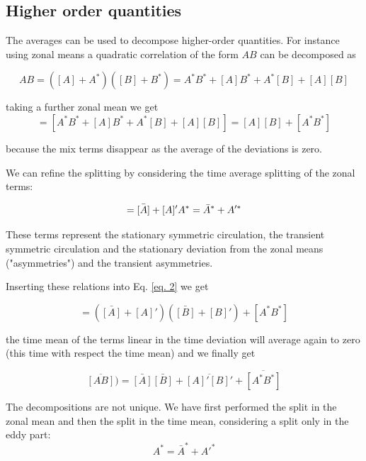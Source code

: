 \subsection{Higher order quantities}

The averages can be used to decompose higher-order quantities. For
instance using zonal means a quadratic correlation of the form \(A B\)
can be decomposed as

\begin{equation}
    A B = ([A]+A^*)([B]+B^*) = A^*B^* + [A] B^*+ A^*[B] + [A][B]
\end{equation}

taking a further zonal mean we get
\begin{equation}\label{eq. 2}
= [A^*B^*+ [A]B^* + A^*[B] + [A][B]] =  [A][B] + [A^*B^*]
\end{equation}

because the mix terms disappear as the average of the deviations is
zero.

We can refine the splitting by considering the time average splitting of
the zonal terms:

\begin{equation}
    = \bar{[A]} + [A]' \\
A^* = \bar{A}^* + A'^*
\end{equation}

These terms represent the stationary symmetric circulation, the
transient symmetric circulation and the stationary deviation from the
zonal means ("asymmetries") and the transient asymmetries.

Inserting these relations into Eq. \ref{eq. 2} we get


\begin{equation}
    = (\bar{[A]} + [A]')(\bar{[B]} + [B]') + [A^*B^*]
\end{equation}
    
the time mean of the terms linear in the time deviation will average
again to zero (this time with respect the time mean) and we finally get

\begin{equation}
    \overline{[AB]}) = \bar{[A]}\bar{[B]} + \overline{[A]'[B]'} + \overline{[A^*B^*]}
\end{equation}

The decompositions are not unique. We have first performed the split in
the zonal mean and then the split in the time mean, considering a split
only in the eddy part:
\begin{equation}
    A^* =    \bar{A}^* + A'^*
\end{equation}


